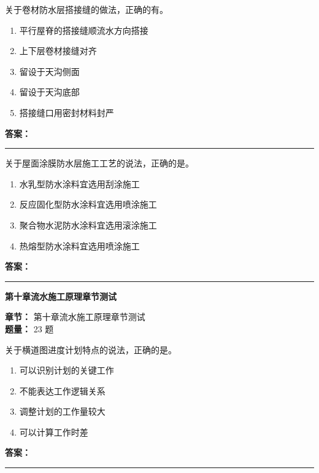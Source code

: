 \documentclass[UTF8,fontset=fandol,11pt]{ctexart}
\newcommand{\chaptertitle}[1]{\vspace{0.5em}\begin{tcolorbox}[enhanced,colback=deepblue,colframe=deepblue,arc=2mm,boxrule=0pt]\begin{center}\Large\bfseries\color{white}#1\end{center}\end{tcolorbox}\vspace{0.5em}}
\newcommand{\answerline}{\textcolor{answerred}{\rule{2.4cm}{0.7pt}}}
\begin{document}
\begin{quizbox}[title={第 6 题}]
关于卷材防水层搭接缝的做法，正确的有。\\
\begin{enumerate}[label=\Alph*.]
\item 平行屋脊的搭接缝顺流水方向搭接
\item 上下层卷材接缝对齐
\item 留设于天沟侧面
\item 留设于天沟底部
\item 搭接缝口用密封材料封严
\end{enumerate}
\textbf{\textcolor{answerred}{答案：}} \answerline
\end{quizbox}

\vspace{0.2em}

\begin{quizbox}[title={第 7 题}]
关于屋面涂膜防水层施工工艺的说法，正确的是。\\
\begin{enumerate}[label=\Alph*.]
\item 水乳型防水涂料宜选用刮涂施工
\item 反应固化型防水涂料宜选用喷涂施工
\item 聚合物水泥防水涂料宜选用滚涂施工
\item 热熔型防水涂料宜选用喷涂施工
\end{enumerate}
\textbf{\textcolor{answerred}{答案：}} \answerline
\end{quizbox}

\vspace{0.2em}

\chaptertitle{第十章流水施工原理章节测试}
\begin{mainbox}
\textbf{\textcolor{mainblue}{章节：}} 第十章流水施工原理章节测试\\
\textbf{\textcolor{answerred}{题量：}} 23 题
\end{mainbox}

\begin{quizbox}[title={第 1 题}]
关于横道图进度计划特点的说法，正确的是。\\
\begin{enumerate}[label=\Alph*.]
\item 可以识别计划的关键工作
\item 不能表达工作逻辑关系
\item 调整计划的工作量较大
\item 可以计算工作时差
\end{enumerate}
\textbf{\textcolor{answerred}{答案：}} \answerline
\end{quizbox}
\end{document}

